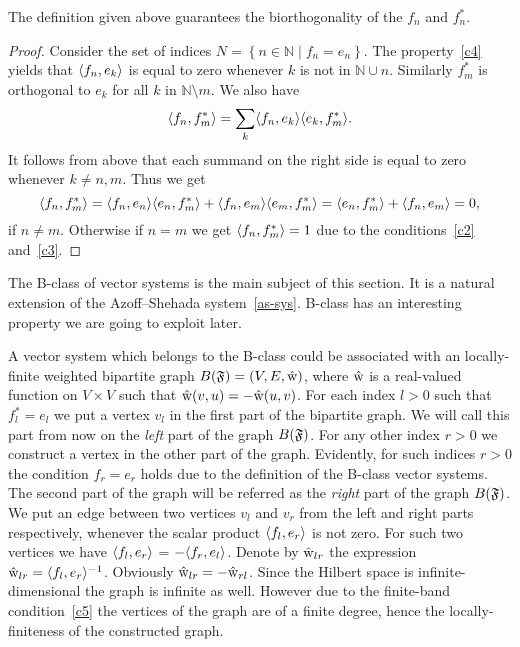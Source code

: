 \documentclass[12pt]{amsart}
\begin{document}
    \begin{prop}
      The definition given above guarantees the biorthogonality of the $f_n$ and $f^*_n$.
    \end{prop}
    \begin{proof}
      Consider the set of indices $N = \left\{n \in \mathbb{N} \mid f_n = e_n \right\}$.
      The property~\ref{c4} yields that $\langle f_n, e_k \rangle$ is equal to zero whenever $k$ is not in
        $\mathbb{N} \cup {n}$.
      Similarly $f^*_m$ is orthogonal to $e_k$ for all $k$ in $\mathbb{N} \setminus {m}$.
      We also have
      \[
        \langle f_n, f^*_m \rangle = \sum_{k} \langle f_n, e_k \rangle \langle e_k, f^*_m \rangle.
      \]
      It follows from above that each summand on the right side is equal to zero whenever $k \neq n, m$.
      Thus we get
      \[
        \langle f_n, f^*_m \rangle = \langle f_n, e_n \rangle \langle e_n, f^*_m \rangle + \langle f_n, e_m \rangle \langle e_m, f^*_m \rangle
        = \langle e_n, f^*_m \rangle + \langle f_n, e_m \rangle = 0,
      \]
      if $n \neq m$.
      Otherwise if $n = m$ we get $\langle f_n, f^*_m \rangle = 1$ due to the conditions~\ref{c2} and~\ref{c3}.
    \end{proof}
    The B-class of vector systems is the main subject of this section.
    It is a natural extension of the Azoff--Shehada system~\eqref{as-sys}.
    B-class has an interesting property we are going to exploit later.
    \begin{remark}
      A vector system which belongs to the B-class could be associated with an
        locally-finite weighted bipartite graph $B(\mathfrak{F}) = (V, E, \mathrm{\hat{w}})$, where $\mathrm{\hat{w}}$ is a
        real-valued function on $V\times V$ such that $\mathrm{\hat{w}}(v, u) = -\mathrm{\hat{w}}(u, v)$.
      For each index $l > 0$ such that $f^*_l = e_l$ we put a vertex $v_l$ in the first part of the bipartite graph.
      We will call this part from now on the \emph{left} part of the graph $B(\mathfrak{F})$.
      For any other index $r > 0$ we construct a vertex in the other part of the graph.
      Evidently, for such indices $r > 0$ the condition $f_r = e_r$ holds due to the definition of the B-class vector systems.
      The second part of the graph will be referred as the \emph{right} part of the graph $B(\mathfrak{F})$.
      We put an edge between two vertices $v_l$ and $v_r$ from the left and right parts respectively,
        whenever the scalar product $\langle f_l, e_r \rangle$ is not zero.
      For such two vertices we have $\langle f_l, e_r \rangle$ = $-\langle f_r, e_l \rangle$.
      Denote by $\mathrm{\hat{w}}_{lr}$ the expression $\mathrm{\hat{w}}_{lr} = \langle f_l, e_r \rangle^{-1}$.
      Obviously $\mathrm{\hat{w}}_{lr} = -\mathrm{\hat{w}}_{rl}$.
      Since the Hilbert space is infinite-dimensional the graph is infinite as well.
      However due to the finite-band condition~\ref{c5} the vertices of the graph are of a finite degree, hence the locally-finiteness of
        the constructed graph.
    \end{remark}
\end{document}
